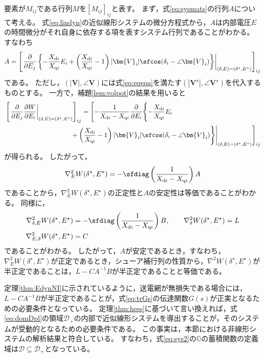 \documentclass[tombow,dvipdfmx]{corona-a5}
\begin{document}
\begin{証明}
要素が$M_{ij}$である行列$M$を$[M_{ij}]_{ij}$と表す。
まず，式\ref{eq:sysmats}の行列$A$について考える。
式\ref{eq:lindyn}の近似線形システムの微分方程式から，$A$は内部電圧$E$の時間微分がそれ自身に依存する項を表すシステム行列であることがわかる。
すなわち
\begin{align*}
A = \left[
\left.
\frac{\partial}{\partial E_j}
\left\{
-\frac{X_{{\rm d}i}}{X_{{\rm q}i}}E_i
+\left(
\frac{X_{{\rm d}i}}{X_{{\rm q}i}}-1
\right)
|\bm{V}_i| \sfcos (\delta_i - \angle \bm{V}_i ) 
\right\}
\right|_{(\delta,E)=(\delta^{\star},E^{\star})}
\right]_{ij}
\end{align*}
である。
ただし，$(|\bm{V}|,\angle \bm{V})$には式\ref{eq:eqeqa}を満たす$(|\bm{V}^{\star}|,\angle \bm{V}^{\star})$を代入するものとする。
一方で，補題\ref{lem:volpot}の結果を用いると
\begin{align*}
&\left[
\left.
\frac{\partial}{\partial E_j}
\frac{\partial W}{\partial E_i}
\right|_{(\delta,E)=(\delta^{\star},E^{\star})}
\right]_{ij}
=
\Biggl[
\Biggl.
-\frac{1}{X_{{\rm d}i} - X_{{\rm q}i}}
\frac{\partial}{\partial E_i}
\Biggl\{
-\frac{X_{{\rm d}i}}{X_{{\rm q}i}}E_i
\\
&\hspace{10em}
+\left(
\frac{X_{{\rm d}i}}{X_{{\rm q}i}}-1
\right)
|\bm{V}_i| \sfcos (\delta_i - \angle \bm{V}_i ) 
\Biggr\}
\Biggr|_{(\delta,E)=(\delta^{\star},E^{\star})}
\Biggr]_{ij}
\end{align*}
が得られる。
したがって，
\begin{align*}
\nabla^2_{E} W(\delta^{\star}, E^{\star})
= 
-\sfdiag\left(
\frac{1}{X_{{\rm d}i} - X_{{\rm q}i}}
\right)
A
\end{align*}
であることから，$\nabla^2_{E} W(\delta^{\star}, E^{\star})$の正定性と$A$の安定性は等価であることがわかる。
同様に，
\begin{align*}
\nabla^2_{\delta,E} W(\delta^{\star}, E^{\star})
&=
-\sfdiag\left(
\frac{1}{X_{{\rm d}i} - X_{{\rm q}i}}
\right)
B,
\qquad
\nabla^2_{\delta} W(\delta^{\star}, E^{\star})
=L
\\
\nabla^2_{E,\delta} W(\delta^{\star}, E^{\star})
& =
C
\end{align*}
であることがわかる。
したがって，$A$が安定であるとき，すなわち，$\nabla^2_{E} W(\delta^{\star}, E^{\star})$が正定であるとき，シューア補行列の性質から，$\nabla^2 W(\delta^{\star}, E^{\star})$が半正定であることは，$L-CA^{-1}B$が半正定であることと等価である。
\end{証明}

定理\ref{thm:EdynNI}に示されているように，送電網が無損失である場合には，$L-CA^{-1}B$が半正定であることが，式\ref{eq:trGs}の伝達関数$G(s)$が正実となるための必要条件となっている。
定理\ref{thm:hess}に基づいて言い換えれば，式\ref{eq:domDpl}の領域$\mathcal{D}_{+}$の内部で近似線形システムを導出することが，そのシステムが受動的となるための必要条件である。
この事実は，本節における非線形システムの解析結果と符合している。
すなわち，式\ref{eq:sys2}の$\mathds{G}$の蓄積関数の定義域は$\mathcal{D}\subseteq \mathcal{D}_{+}$となっている。
\end{document}
